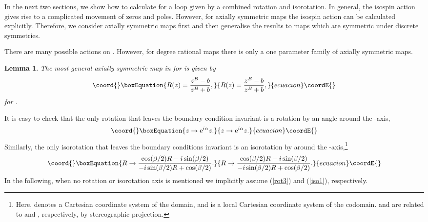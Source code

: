 \documentclass[a4paper,12pt]{article}
\newtheorem {lemma}[theorem]{Lemma}
\begin{document}
In the next two sections, we show how to calculate \coordHE{} for a loop given by 
a combined 
rotation and isorotation. In general, the isospin action gives rise to a 
complicated movement of zeros and poles. However, for axially symmetric 
maps the isospin action can be calculated explicitly. 
Therefore, we consider axially symmetric maps first and then  
generalise the results to maps which are symmetric under discrete symmetries.

There are many possible \coordHE{} actions on \coordHE{}. However, for 
degree \coordHE{} rational maps there is only a one parameter family of axially 
symmetric maps.

\begin{lemma}
\label{l:axial}
The most general axially symmetric map in \coordHE{} for \coordHE{} is 
given by
\begin{equation}\coord{}\boxEquation{
\label{R_axial}
R(z) = \frac{z^B-b}{z^B+b},
}{
R(z) = \frac{z^B-b}{z^B+b},
}{ecuacion}\coordE{}\end{equation}
%
for \coordHE{}.
\end{lemma} 

It is easy to check that the only rotation that leaves the boundary condition 
\coordHE{} invariant is a rotation by an angle \myHighlight{$\alpha$}\coordHE{} around the 
\coordHE{}-axis,
%
\begin{equation}\coord{}\boxEquation{
\label{rot3}
z \to {\rm e}^{i \alpha} z.
}{
z \to {\rm e}^{i \alpha} z.
}{ecuacion}\coordE{}\end{equation}
%
Similarly, the only isorotation that leaves the boundary conditions 
invariant is an isorotation by \myHighlight{$\beta$}\coordHE{} around the 
\coordHE{}-axis,\footnote{Here, \coordHE{} denotes a Cartesian coordinate system of 
the domain, and \coordHE{} is a local Cartesian coordinate system of the 
codomain. 
\coordHE{} and \coordHE{} are related to \coordHE{} and \coordHE{}, respectively, by stereographic 
projection.} 
%
\begin{equation}\coord{}\boxEquation{
\label{iso1}
R \to \frac{\cos(\beta/2) R - i \sin(\beta/2)}
{-i \sin(\beta/2) R + \cos(\beta/2)}.  
}{
R \to \frac{\cos(\beta/2) R - i \sin(\beta/2)}
{-i \sin(\beta/2) R + \cos(\beta/2)}.  
}{ecuacion}\coordE{}\end{equation}
%
In the following, when no rotation or isorotation axis is mentioned we 
implicitly assume (\ref{rot3}) and (\ref{iso1}), respectively.
\end{document}
